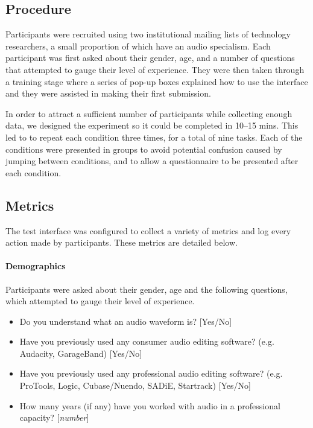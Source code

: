 \subsection{Procedure}
Participants were recruited using two institutional mailing lists of technology researchers, a small proportion of
which have an audio specialism. Each participant was first asked about their gender, age, and a number of questions
that attempted to gauge their level of experience. They were then taken through a training stage where a series of
pop-up boxes explained how to use the interface and they were assisted in making their first submission.

In order to attract a sufficient number of participants while collecting enough data, we designed the experiment so it
could be completed in 10--15 mins. This led to to repeat each condition three times, for a total of nine tasks.
Each of the conditions were presented in groups to avoid potential confusion caused by jumping between conditions, and
to allow a questionnaire to be presented after each condition.

\subsection{Metrics}
The test interface was configured to collect a variety of metrics and log every action made by participants. 
These metrics are detailed below.

\paragraph{Demographics}
Participants were asked about their gender, age and the following questions, which attempted to gauge their level of
experience.

{\singlespacing
\begin{itemize}
  \item Do you understand what an audio waveform is? [Yes/No]
  \item Have you previously used any consumer audio editing software? (e.g.
    Audacity, GarageBand) [Yes/No]
  \item Have you previously used any professional audio editing software? (e.g.
    ProTools, Logic, Cubase/Nuendo, SADiE, Startrack) [Yes/No]
  \item How many years (if any) have you worked with audio in a professional
    capacity? [\textit{number}]
\end{itemize}
}

